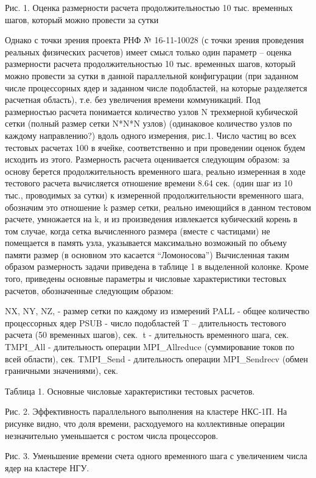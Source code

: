 Рис. 1. Оценка размерности расчета продолжительностью 10 тыс. временных шагов,  который можно провести за сутки

Однако с точки зрения проекта РНФ № 16-11-10028 (с точки зрения проведения реальных физических расчетов) имеет смысл только один параметр – оценка размерности расчета продолжительностью 10 тыс. временных шагов,  который можно провести за сутки в данной параллельной конфигурации (при заданном числе процессорных ядер и заданном числе подобластей, на которые разделяется расчетная область), т.е. без увеличения времени коммуникаций. Под размерностью расчета понимается количество узлов N трехмерной кубической сетки (полный размер сетки N*N*N узлов) (одинаковое количество узлов по каждому направлению?) вдоль одного измерения, рис.1. Число частиц во всех тестовых расчетах 100 в ячейке, соответственно и при проведении оценок будем исходить из этого. Размерность расчета оценивается следующим образом:
за основу берется продолжительность временного шага, реально измеренная в ходе тестового расчета
вычисляется отношение времени 8.64 сек. (один шаг из 10 тыс., проводимых за сутки) к измеренной продолжительности временного шага, обозначим это отношение k
размер сетки, реально имеющийся в данном тестовом расчете, умножается на k, и из произведения извлекается кубический корень
в том случае, когда сетка вычисленного размера (вместе с частицами) не помещается в память узла, указывается максимально возможный по объему памяти размер (в основном это касается “Ломоносова”)
Вычисленная таким образом размерность задачи приведена в таблице 1 в выделенной колонке. Кроме того, приведены основные параметры и числовые характеристики тестовых расчетов, обозначенные следующим образом:

NX, NY, NZ,  - размер сетки по каждому из измерений
PALL  - общее количество процессорных ядер
PSUB  - число подобластей
T – длительность тестового расчета (50 временных шагов), сек.
t  - длительность временного шага, сек.
TMPI_All - длительность операции MPI_Allreduce (суммирование токов по всей области), сек.
TMPI_Send - длительность операции MPI_Sendrecv (обмен граничными значениями), сек.

Таблица 1. Основные числовые характеристики тестовых расчетов.




Рис. 2. Эффективность параллельного выполнения на кластере НКС-1П. На рисунке видно, что доля времени, расходуемого на коллективные операции незначительно уменьшается с ростом числа процессоров.


Рис. 3. Уменьшение времени счета одного временного шага с увеличением числа ядер на кластере НГУ.


